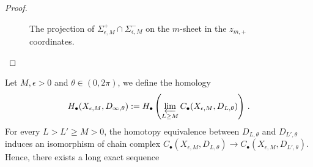\documentclass[12pt,reqno]{amsart}
\theoremstyle{definition}
\def\BR{\mathbb R}
\def\calC{\mathcal C}
\def\be{\begin{equation}}
\def\ee{\end{equation}}
\renewcommand{\=}{\;=\;}
\begin{document}
\begin{proof}
\begin{figure}[ht]
\caption{The projection of $\Sigma_{\epsilon,M}^+\cap\Sigma_{\epsilon,M}^{-}$ on the $m$-sheet in the $z_{m,+}$ coordinates.}\label{fig:intersection}
\end{figure} 
%
\end{proof}
%
%
Let $M,\epsilon>0$ and $\theta\in(0,2\pi)$, we define
the homology 
\be
H_\bullet(X_{\epsilon,M},D_{\infty,\theta}):= H_{\bullet}\left(\varprojlim_{L\ge M} C_\bullet(X_{\epsilon,M},D_{L,\theta})\right)\,.
\ee 
For every $L>L'\geq M>0$, the homotopy equivalence between $D_{L,\theta}$ and $D_{L',\theta}$ induces an isomorphism of chain complex $C_\bullet(X_{\epsilon,M},D_{L,\theta})\to C_\bullet(X_{\epsilon,M},D_{L',\theta})$. Hence, there exists a long exact sequence 
\end{document}
